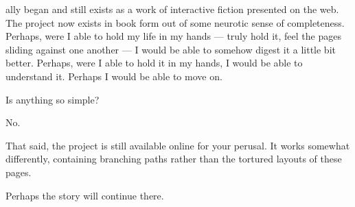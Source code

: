 
\begin{paracol}{2}
\begin{leftcolumn}
  {\allyFont ally} began and still exists as a work of interactive fiction presented on the web. The project now exists in book form out of some neurotic sense of completeness. Perhaps, were I able to hold my life in my hands --- truly hold it, feel the pages sliding against one another --- I would be able to somehow digest it a little bit better. Perhaps, were I able to hold it in my hands, I would be able to understand it. Perhaps I would be able to move on.

  \begin{ally}
    Is anything so simple?
  \end{ally}
  No.

  That said, the project is still available online for your perusal. It works somewhat differently, containing branching paths rather than the tortured layouts of these pages.

  Perhaps the story will continue there.


\end{leftcolumn}
\end{paracol}

